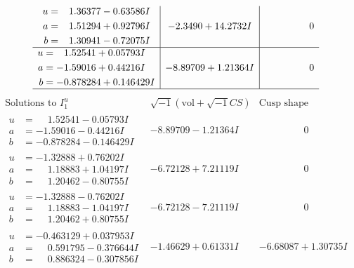 \documentclass[1p]{elsarticle_modified}
\theoremstyle{definition}
\newcommand{\I}{\sqrt{-1}}
\begin{document}
$$\begin{array}{c|c|c}
\begin{aligned}
u &= \phantom{-}1.36377 - 0.63586 I \\
a &= \phantom{-}1.51294 + 0.92796 I \\
b &= \phantom{-}1.30941 - 0.72075 I\end{aligned}
 & -2.3490 + 14.2732 I & \phantom{-0.000000 } 0 \\ \hline\begin{aligned}
u &= \phantom{-}1.52541 + 0.05793 I \\
a &= -1.59016 + 0.44216 I \\
b &= -0.878284 + 0.146429 I\end{aligned}
 & -8.89709 + 1.21364 I & \phantom{-0.000000 } 0\\
 \hline 
 \end{array}$$\newpage$$\begin{array}{c|c|c}  
\text{Solutions to }I^u_{1}& \I (\text{vol} + \sqrt{-1}CS) & \text{Cusp shape}\\
 \hline 
\begin{aligned}
u &= \phantom{-}1.52541 - 0.05793 I \\
a &= -1.59016 - 0.44216 I \\
b &= -0.878284 - 0.146429 I\end{aligned}
 & -8.89709 - 1.21364 I & \phantom{-0.000000 } 0 \\ \hline\begin{aligned}
u &= -1.32888 + 0.76202 I \\
a &= \phantom{-}1.18883 + 1.04197 I \\
b &= \phantom{-}1.20462 - 0.80755 I\end{aligned}
 & -6.72128 + 7.21119 I & \phantom{-0.000000 } 0 \\ \hline\begin{aligned}
u &= -1.32888 - 0.76202 I \\
a &= \phantom{-}1.18883 - 1.04197 I \\
b &= \phantom{-}1.20462 + 0.80755 I\end{aligned}
 & -6.72128 - 7.21119 I & \phantom{-0.000000 } 0 \\ \hline\begin{aligned}
u &= -0.463129 + 0.037953 I \\
a &= \phantom{-}0.591795 - 0.376644 I \\
b &= \phantom{-}0.886324 - 0.307856 I\end{aligned}
 & -1.46629 + 0.61331 I & -6.68087 + 1.30735 I \\ \hline\begin{aligned}

\end{aligned}
\end{array}$$
\end{document}
